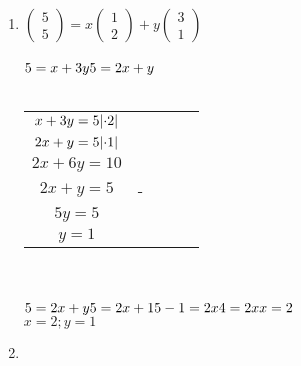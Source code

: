 \documentclass[a4paper]{article}
\begin{document}
\begin{enumerate}[1.]
		\item $\begin{pmatrix}5 \\ 5\end{pmatrix} = x\begin{pmatrix}1 \\ 2\end{pmatrix} + y\begin{pmatrix}3 \\1\end{pmatrix}$\\\\
		$5 = x +3y\\
		5 = 2x + y$\\\\
		\begin{tabular}{c@{\,}c@{\,}c@{\,}c@{\,}c}
			$x + 3y = 5 \abs{\cdot{2}}$\\
			$2x + y = 5 \abs{\cdot{1}}$\\
			\hline
			$2x + 6y = 10$\\
			$2x + y = 5$&-\\
			\hline
			$5y = 5$\\
			$y = 1$
		\end{tabular}
		\\\\$5 = 2x + y\\
		5 = 2x + 1\\
		5 - 1 = 2x\\
		4 = 2x\\
		x = 2$\\
		$x=2 ; y=1$
		\item 
	\end{enumerate}
\end{document}
